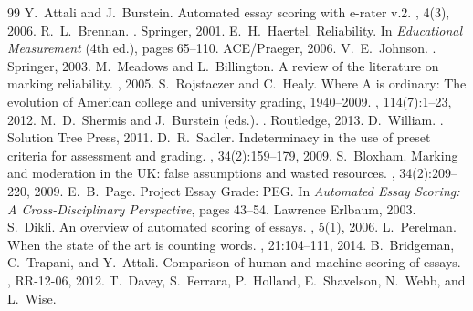 \documentclass[11pt,a4paper]{article}
\theoremstyle{definition}
\theoremstyle{remark}
\begin{document}
\begin{enumerate}[label=(\roman*)]
\begin{thebibliography}{99}
Y.~Attali and J.~Burstein.
\newblock Automated essay scoring with e-rater v.2.
, 4(3), 2006.
R.~L.~Brennan.
.
\newblock Springer, 2001.
E.~H.~Haertel.
\newblock Reliability.
\newblock In {\em Educational Measurement} (4th ed.), pages 65--110. ACE/Praeger, 2006.
V.~E.~Johnson.
.
\newblock Springer, 2003.
M.~Meadows and L.~Billington.
\newblock A review of the literature on marking reliability.
, 2005.
S.~Rojstaczer and C.~Healy.
\newblock Where A is ordinary: The evolution of American college and university grading, 1940--2009.
, 114(7):1--23, 2012.
M.~D.~Shermis and J.~Burstein (eds.).
.
\newblock Routledge, 2013.
D.~William.
.
\newblock Solution Tree Press, 2011.
D.~R.~Sadler.
\newblock Indeterminacy in the use of preset criteria for assessment and grading.
, 34(2):159--179, 2009.
S.~Bloxham.
\newblock Marking and moderation in the UK: false assumptions and wasted resources.
, 34(2):209--220, 2009.
E.~B.~Page.
\newblock Project Essay Grade: PEG.
\newblock In {\em Automated Essay Scoring: A Cross-Disciplinary Perspective}, pages 43--54. Lawrence Erlbaum, 2003.
S.~Dikli.
\newblock An overview of automated scoring of essays.
, 5(1), 2006.
L.~Perelman.
\newblock When the state of the art is counting words.
, 21:104--111, 2014.
B.~Bridgeman, C.~Trapani, and Y.~Attali.
\newblock Comparison of human and machine scoring of essays.
, RR-12-06, 2012.
T.~Davey, S.~Ferrara, P.~Holland, E.~Shavelson, N.~Webb, and L.~Wise.

\end{thebibliography}
\end{enumerate}
\end{document}
